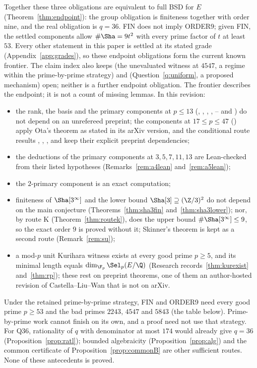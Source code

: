 Together these three obligations are equivalent to full BSD for $E$ (Theorem~\ref{thm:endpoint}): the group obligation is finiteness together with order nine, and the real obligation is $q=36$. FIN does not imply ORDER9; given FIN, the settled components allow $\#\Sha=9t^2$ with every prime factor of $t$ at least $53$. Every other statement in this paper is settled at its stated grade (Appendix~\ref{app:grades}), so these endpoint obligations form the current known frontier. The claim index also keeps  (the unevaluated witness at $4547$, a regime within the prime-by-prime strategy) and  (Question~\ref{q:uniform}, a proposed mechanism) open; neither is a further endpoint obligation. The frontier describes the endpoint; it is not a count of missing lemmas. In this revision:
\begin{itemize}[leftmargin=*]
\item the rank, the basis and the primary components at $p\le13$ (, , , , -- and ) do not depend on an unrefereed preprint; the components at $17\le p\le47$ () apply Ota's theorem as stated in its arXiv version, and the conditional route results , , ,  and  keep their explicit preprint dependencies;
\item the deductions of the primary components at $3,5,7,11,13$ are Lean-checked from their listed hypotheses (Remarks~\ref{rem:a4lean} and~\ref{rem:a5lean});
\item the $2$-primary component is an exact computation;
\item finiteness of $\Sha[3^\infty]$ and the lower bound $\Sha[3]\supseteq(\Z/3)^2$ do not depend on the main conjecture (Theorems~\ref{thm:sha3fin} and~\ref{thm:sha3lower}); nor, by route K (Theorem~\ref{thm:routek}), does the upper bound $\#\Sha[3^\infty]\le9$, so the exact order $9$ is proved without it; Skinner's theorem is kept as a second route (Remark~\ref{rem:su});
\item a mod-$p$ unit Kurihara witness exists at every good prime $p\ge5$, and its minimal length equals $\dim_{\F_p}\Sel_p(E/\Q)$ (Research records~\ref{thm:kurexist} and~\ref{thm:rp}); these rest on preprint theorems, one of them an author-hosted revision of Castella--Liu--Wan \cite{clw} that is not on arXiv.
\end{itemize}
Under the retained prime-by-prime strategy, FIN and ORDER9 need every good prime $p\ge53$ and the bad primes $2243$, $4547$ and $5843$ (the table below). Prime-by-prime work cannot finish on its own, and a proof need not use that strategy. For Q36, rationality of $q$ with denominator at most $174$ would already give $q=36$ (Proposition~\ref{prop:ratl}); bounded algebraicity (Proposition~\ref{prop:alg}) and the common certificate of Proposition~\ref{prop:commonB} are other sufficient routes. None of these antecedents is proved.

